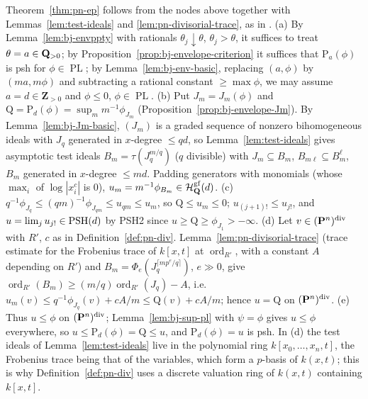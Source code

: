 \begin{remark}\label{rmk:bj-pn-ep-assembly}
Theorem~\ref{thm:pn-ep} follows from the nodes above together with Lemmas~\ref{lem:test-ideals} and
\ref{lem:pn-divisorial-trace}, as in \cite[\S3]{FHX}. (a) By Lemma~\ref{lem:bj-envppty} with rationals
$\theta_j\downarrow\theta$, $\theta_j>\theta$, it suffices to treat $\theta=a\in\mathbf{Q}_{>0}$; by
Proposition~\ref{prop:bj-envelope-criterion} it suffices that $\mathrm P_a(\phi)$ is psh for $\phi\in\operatorname{PL}$;
by Lemma~\ref{lem:bj-env-basic}, replacing $(a,\phi)$ by $(ma,m\phi)$ and subtracting a rational constant
$\ge\max\phi$, we may assume $a=d\in\mathbf{Z}_{>0}$ and $\phi\le0$, $\phi\in\operatorname{PL}$. (b) Put $J_m=J_m(\phi)$ and
$\mathrm Q=\mathrm P_d(\phi)=\sup_mm^{-1}\phi_{J_m}$ (Proposition~\ref{prop:bj-envelope-Jm}). By
Lemma~\ref{lem:bj-Jm-basic}, $(J_m)$ is a graded sequence of nonzero bihomogeneous ideals with $J_q$ generated in
$x$-degree $\le qd$, so Lemma~\ref{lem:test-ideals} gives asymptotic test ideals $B_m=\tau(J_q^{m/q})$ ($q$
divisible) with $J_m\subseteq B_m$, $B_{m\ell}\subseteq B_m^\ell$, $B_m$ generated in $x$-degree $\le md$.
Padding generators with monomials (whose $\max_i$ of $\log|x_i^c|$ is $0$), $u_m=m^{-1}\phi_{B_m}\in
\mathcal H^{\mathrm{gf}}_{\mathbf{Q}}(d)$. (c) $q^{-1}\phi_{J_q}\le(qm)^{-1}\phi_{J_{qm}}\le u_{qm}\le u_m$, so $\mathrm Q\le u_m\le0$;
$u_{(j+1)!}\le u_{j!}$, and $u=\lim_ju_{j!}\in\operatorname{PSH}(d)$ by PSH2 since $u\ge\mathrm Q\ge\phi_{J_1}>-\infty$. (d) Let
$v\in(\mathbf{P}^n)^{\mathrm{div}}$ with $R'$, $c$ as in Definition~\ref{def:pn-div}. Lemma~\ref{lem:pn-divisorial-trace}
(trace estimate for the Frobenius trace of $k[x,t]$ at $\operatorname{ord}_{R'}$, with a constant $A$ depending on $R'$)
and $B_m=\Phi_e(J_q^{\lceil mp^e/q\rceil})$, $e\gg0$, give $\operatorname{ord}_{R'}(B_m)\ge(m/q)\operatorname{ord}_{R'}(J_q)-A$, i.e.\
$u_m(v)\le q^{-1}\phi_{J_q}(v)+cA/m\le\mathrm Q(v)+cA/m$; hence $u=\mathrm Q$ on $(\mathbf{P}^n)^{\mathrm{div}}$. (e) Thus $u\le\phi$
on $(\mathbf{P}^n)^{\mathrm{div}}$; Lemma~\ref{lem:bj-sup-pl} with $\psi=\phi$ gives $u\le\phi$ everywhere, so
$u\le\mathrm P_d(\phi)=\mathrm Q\le u$, and $\mathrm P_d(\phi)=u$ is psh. In (d) the test ideals of
Lemma~\ref{lem:test-ideals} live in the polynomial ring $k[x_0,\dots,x_n,t]$, the Frobenius trace being that of
the variables, which form a $p$-basis of $k(x,t)$; this is why Definition~\ref{def:pn-div} uses a discrete
valuation ring of $k(x,t)$ containing $k[x,t]$.
\end{remark}

